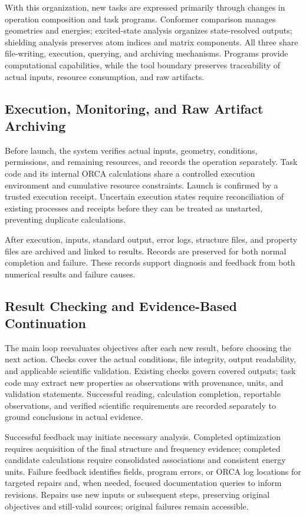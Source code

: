 With this organization, new tasks are expressed primarily through changes in operation composition and task programs.
Conformer comparison manages geometries and energies; excited-state analysis organizes state-resolved outputs; shielding analysis preserves atom indices and matrix components.
All three share file-writing, execution, querying, and archiving mechanisms.
Programs provide computational capabilities, while the tool boundary preserves traceability of actual inputs, resource consumption, and raw artifacts.

\subsection{Execution, Monitoring, and Raw Artifact Archiving}
Before launch, the system verifies actual inputs, geometry, conditions, permissions, and remaining resources, and records the operation separately.
Task code and its internal ORCA calculations share a controlled execution environment and cumulative resource constraints.
Launch is confirmed by a trusted execution receipt.
Uncertain execution states require reconciliation of existing processes and receipts before they can be treated as unstarted, preventing duplicate calculations.

After execution, inputs, standard output, error logs, structure files, and property files are archived and linked to results.
Records are preserved for both normal completion and failure.
These records support diagnosis and feedback from both numerical results and failure causes.

\subsection{Result Checking and Evidence-Based Continuation}
The main loop reevaluates objectives after each new result, before choosing the next action.
Checks cover the actual conditions, file integrity, output readability, and applicable scientific validation.
Existing checks govern covered outputs; task code may extract new properties as observations with provenance, units, and validation statements.
Successful reading, calculation completion, reportable observations, and verified scientific requirements are recorded separately to ground conclusions in actual evidence.

Successful feedback may initiate necessary analysis.
Completed optimization requires acquisition of the final structure and frequency evidence; completed candidate calculations require consolidated associations and consistent energy units.
Failure feedback identifies fields, program errors, or ORCA log locations for targeted repairs and, when needed, focused documentation queries to inform revisions.
Repairs use new inputs or subsequent steps, preserving original objectives and still-valid sources; original failures remain accessible.

